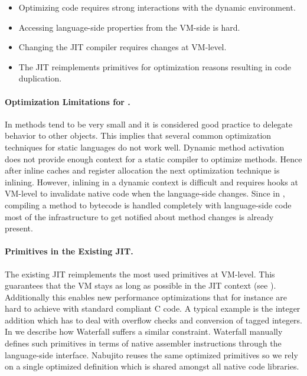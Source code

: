 \begin{itemize}
	\item Optimizing \ST code requires strong interactions with the dynamic environment.
	\item Accessing language-side properties from the VM-side is hard.
	\item Changing the JIT compiler requires changes at VM-level.
	\item The JIT reimplements primitives for optimization reasons resulting in code duplication.
\end{itemize}

\paragraph{Optimization Limitations for \PH.}
In \ST methods tend to be very small and it is considered good practice to delegate behavior to other objects.
This implies that several common optimization techniques for static languages do not work well.
Dynamic method activation does not provide enough context for a static compiler to optimize methods.
Hence after inline caches and register allocation the next optimization technique is inlining.
However, inlining in a dynamic context is difficult and requires hooks at VM-level to invalidate native code when the language-side changes.
Since in \PH, compiling a method to bytecode is handled completely with language-side code most of the infrastructure to get notified about method changes is already present.

\paragraph{Primitives in the Existing JIT.}
The existing JIT reimplements the most used primitives at VM-level.
This guarantees that the VM stays as long as possible in the JIT context (see ). Additionally this enables new performance optimizations that for instance are hard to achieve with standard compliant C code.
A typical example is the integer addition which has to deal with overflow checks and conversion of tagged integers.
In  we describe how Waterfall suffers a similar constraint. Waterfall manually defines such primitives in terms of native assembler instructions through the language-side \B interface.
Nabujito reuses the same optimized primitives so we rely on a single optimized definition which is shared amongst all native code libraries.

